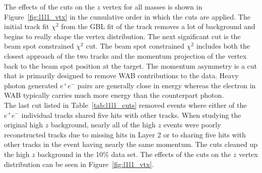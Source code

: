 \indent The effects of the cuts on the $z$ vertex for all masses is shown in Figure~\ref{fig:l1l1_vtx} in the cumulative order in which the cuts are applied. The initial track fit $\chi^{2}$ from the GBL fit of the track removes a lot of background and begins to really shape the vertex distribution. The next significant cut is the beam spot constrained $\chi^{2}$ cut. The beam spot constrained $\chi^{2}$ includes both the closest approach of the two tracks and the momentum projection of the vertex back to the beam spot position at the target. The momentum asymmetry is a cut that is primarily designed to remove WAB contributions to the data. Heavy photon generated $e^+e^-$ pairs are generally close in energy whereas the electron in WAB typically carries much more energy than the counterpart photon.\\ 
\indent The last cut listed in Table~\ref{tab:l1l1_cuts} removed events where either of the $e^+e^-$ individual tracks shared five hits with other tracks. When studying the original high $z$ background, nearly all of the high $z$ events were poorly reconstructed tracks due to missing hits in Layer 2 or to sharing five hits with other tracks in the event having nearly the same momentum. The cuts cleaned up the high $z$ background in the 10$\%$ data set. The effects of the cuts on the $z$ vertex distribution can be seen in Figure~\ref{fig:l1l1_vtx}.

